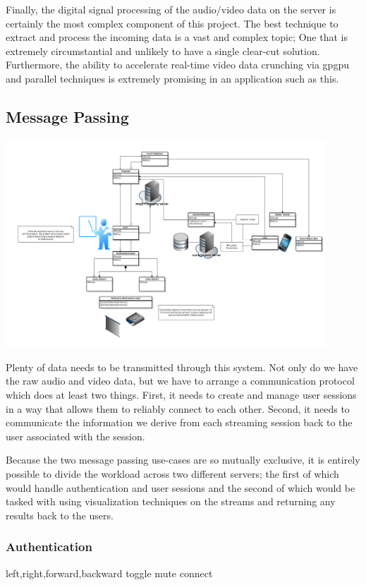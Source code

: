 \documentclass[a4paper,12pt]{report}
\begin{document}
Finally, the digital signal processing of the audio/video data on the server is certainly the most complex component of this project. The best technique to extract and process the incoming data is a vast and complex topic; One that is extremely circumstantial and unlikely to have a single clear-cut solution. Furthermore, the ability to accelerate real-time video data crunching via gpgpu and parallel techniques is extremely promising in an application such as this.

\subsection{Message Passing}
\includegraphics[width=12cm]{blockDiagram}

	Plenty of data needs to be transmitted through this system. Not only do we have the raw audio and video data, but we have to arrange a communication protocol which does at least two things. First, it needs to create and manage user sessions in a way that allows them to reliably connect to each other. Second, it needs to communicate the information we derive from each streaming session back to the user associated with the session.
		
	Because the two message passing use-cases are so mutually exclusive, it is entirely possible to divide the workload across two different servers; the first of which would handle authentication and user sessions and the second of which would be tasked with using visualization techniques on the streams and returning any results back to the users.
		\subsubsection{Authentication}
			left,right,forward,backward
			toggle mute
			connect
\end{document}

